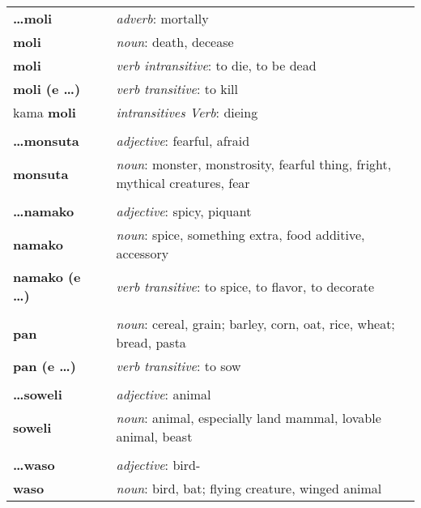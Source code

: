 \begin{supertabular}{p{2,5cm}|ll}
\textbf{\dots moli} && \textit{adverb}: mortally \\ %
\textbf{moli} && \textit{noun}: death, decease \\ %
\textbf{moli} && \textit{verb intransitive}: to die, to be dead \\ %
\textbf{moli (e \dots)} && \textit{verb transitive}: to kill \\ %
kama \textbf{moli} && \textit{intransitives Verb}: dieing \\ %
 && \\ %
%
\textbf{\dots monsuta} && \textit{adjective}: fearful, afraid \\ %
\textbf{monsuta} && \textit{noun}: monster, monstrosity, fearful thing, fright, mythical creatures, fear \\ %
 && \\ %
%
\textbf{\dots namako} && \textit{adjective}: spicy, piquant \\ 
\textbf{namako} && \textit{noun}: spice, something extra, food additive, accessory \\ %
\textbf{namako (e \dots)} && \textit{verb transitive}: to spice, to flavor, to decorate \\ %
 && \\ %
%
\textbf{pan} && \textit{noun}: cereal, grain; barley, corn, oat, rice, wheat; bread, pasta \\ %
\textbf{pan (e \dots)} && \textit{verb transitive}: to sow \\ %
 && \\ %
%
\textbf{\dots soweli} && \textit{adjective}: animal \\ %
\textbf{soweli} && \textit{noun}: animal, especially land mammal, lovable animal, beast \\ %
 && \\ %
%
\textbf{\dots waso} && \textit{adjective}: bird- \\ %
\textbf{waso} && \textit{noun}: bird, bat; flying creature, winged animal \\ %
%
\end{supertabular} \\
%

\newpage
%
